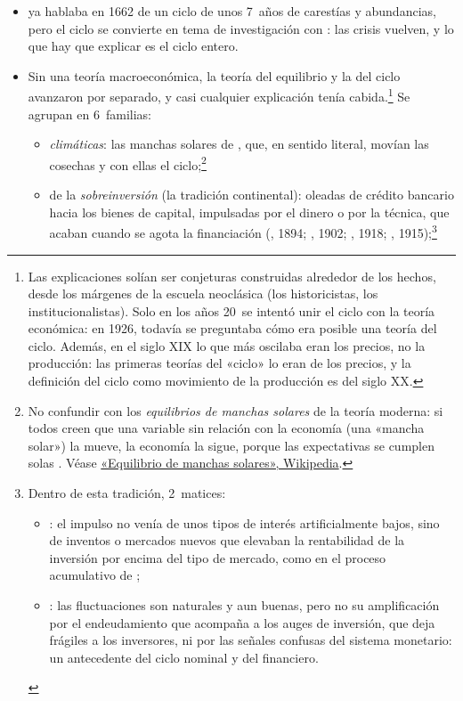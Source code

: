 \documentclass[11pt]{article}
\begin{document}
\begin{itemize}
\item {} ya hablaba en 1662 de un ciclo de unos 7~años de carestías y abundancias\nocite{Petty1662Treatise}, pero el ciclo se convierte en tema de investigación con \textcite{Juglar1862Crises}: las crisis vuelven, y lo que hay que explicar es el ciclo entero.
\item Sin una teoría macroeconómica, la teoría del equilibrio y la del ciclo avanzaron por separado, y casi cualquier explicación tenía cabida.\footnote{Las explicaciones solían ser conjeturas construidas alrededor de los hechos, desde los márgenes de la escuela neoclásica (los historicistas, los institucionalistas). Solo en los años 20~se intentó unir el ciclo con la teoría económica: en 1926,  todavía se preguntaba cómo era posible una teoría del ciclo. Además, en el siglo XIX lo que más oscilaba eran los precios, no la producción: las primeras teorías del «ciclo» lo eran de los precios, y la definición del ciclo como movimiento de la producción es del siglo XX.} Se agrupan en 6~familias:
  \begin{itemize}
  \item \emph{climáticas}: las manchas solares de \textcite{Jevons1884Investigations}, que, en sentido literal, movían las cosechas y con ellas el ciclo;\footnote{No confundir con los \emph{equilibrios de manchas solares} de la teoría moderna\nocite{Azariadis1981Self,CassShell1983Sunspots}: si todos creen que una variable sin relación con la economía (una «mancha solar») la mueve, la economía la sigue, porque las expectativas se cumplen solas . Véase \href{https://es.wikipedia.org/wiki/Equilibrio_de_manchas_solares}{«Equilibrio de manchas solares», Wikipedia}.}
  \item de la \emph{sobreinversión} (la tradición continental): oleadas de crédito bancario hacia los bienes de capital, impulsadas por el dinero o por la técnica, que acaban cuando se agota la financiación (, 1894; , 1902; , 1918; , 1915);\footnote{Dentro de esta tradición, 2~matices:
  \begin{itemize}
  \item {}: el impulso no venía de unos tipos de interés artificialmente bajos, sino de inventos o mercados nuevos que elevaban la rentabilidad de la inversión por encima del tipo de mercado, como en el proceso acumulativo de ;
  \item {}: las fluctuaciones son naturales y aun buenas, pero no su amplificación por el endeudamiento que acompaña a los auges de inversión, que deja frágiles a los inversores, ni por las señales confusas del sistema monetario: un antecedente del ciclo nominal y del financiero.

\end{itemize}}
\end{itemize}
\end{itemize}
\end{document}
